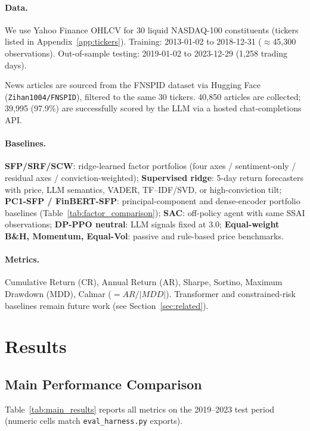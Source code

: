 \documentclass{article}
\begin{document}
\paragraph{Data.}
We use Yahoo Finance OHLCV for 30 liquid NASDAQ-100 constituents (tickers listed in Appendix~\ref{app:tickers}).
Training: 2013-01-02 to 2018-12-31 ($\approx$45,300 observations).
Out-of-sample testing: 2019-01-02 to 2023-12-29 (1,258 trading days).

News articles are sourced from the FNSPID dataset
\citep{toubia2024fnspid} via Hugging Face
(\texttt{Zihan1004/FNSPID}), filtered to the same 30 tickers.
40,850 articles are collected; 39,995 (97.9\%) are successfully
scored by the LLM via a hosted chat-completions API.

\paragraph{Baselines.}
\textbf{SFP/SRF/SCW}: ridge-learned factor portfolios (four axes / sentiment-only / residual axes / conviction-weighted); \textbf{Supervised ridge}: 5-day return forecasters with price, LLM semantics, VADER, TF--IDF/SVD, or high-conviction tilt; \textbf{PC1-SFP / FinBERT-SFP}: principal-component and dense-encoder portfolio baselines (Table~\ref{tab:factor_comparison}); \textbf{SAC}: off-policy agent with same SSAI observations; \textbf{DP-PPO neutral}: LLM signals fixed at 3.0; \textbf{Equal-weight B\&H, Momentum, Equal-Vol}: passive and rule-based price benchmarks.

\paragraph{Metrics.}
Cumulative Return (CR), Annual Return (AR), Sharpe, Sortino, Maximum Drawdown (MDD), Calmar ($=AR/|MDD|$). Transformer and constrained-risk baselines remain future work (see Section~\ref{sec:related}).

\section{Results}
\label{sec:results}

\subsection{Main Performance Comparison}

Table~\ref{tab:main_results} reports all metrics on the 2019–2023
test period (numeric cells match \texttt{eval\_harness.py} exports).
\end{document}
